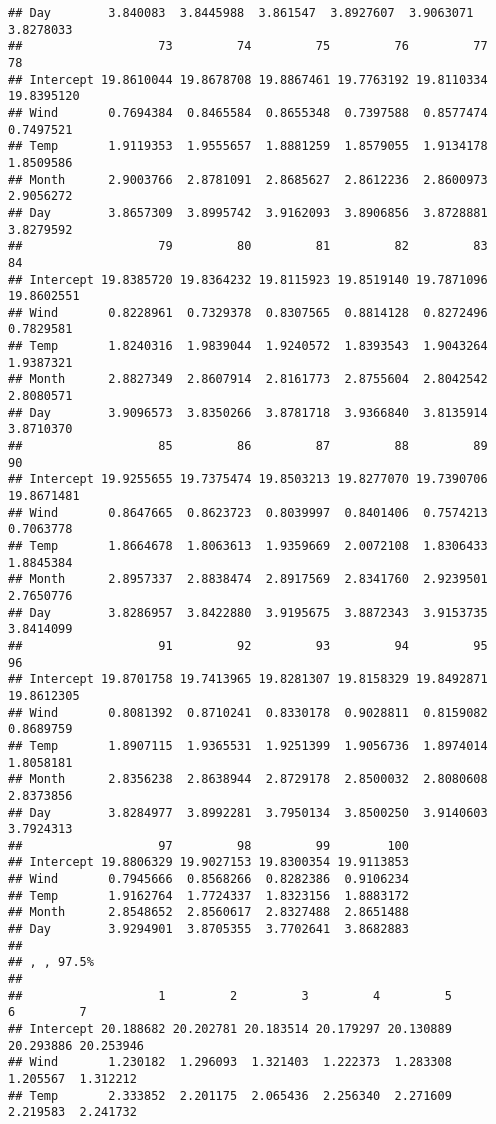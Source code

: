 \documentclass[
]{article}
\begin{document}
\begin{verbatim}
## Day        3.840083  3.8445988  3.861547  3.8927607  3.9063071  3.8278033
##                   73         74         75         76         77         78
## Intercept 19.8610044 19.8678708 19.8867461 19.7763192 19.8110334 19.8395120
## Wind       0.7694384  0.8465584  0.8655348  0.7397588  0.8577474  0.7497521
## Temp       1.9119353  1.9555657  1.8881259  1.8579055  1.9134178  1.8509586
## Month      2.9003766  2.8781091  2.8685627  2.8612236  2.8600973  2.9056272
## Day        3.8657309  3.8995742  3.9162093  3.8906856  3.8728881  3.8279592
##                   79         80         81         82         83         84
## Intercept 19.8385720 19.8364232 19.8115923 19.8519140 19.7871096 19.8602551
## Wind       0.8228961  0.7329378  0.8307565  0.8814128  0.8272496  0.7829581
## Temp       1.8240316  1.9839044  1.9240572  1.8393543  1.9043264  1.9387321
## Month      2.8827349  2.8607914  2.8161773  2.8755604  2.8042542  2.8080571
## Day        3.9096573  3.8350266  3.8781718  3.9366840  3.8135914  3.8710370
##                   85         86         87         88         89         90
## Intercept 19.9255655 19.7375474 19.8503213 19.8277070 19.7390706 19.8671481
## Wind       0.8647665  0.8623723  0.8039997  0.8401406  0.7574213  0.7063778
## Temp       1.8664678  1.8063613  1.9359669  2.0072108  1.8306433  1.8845384
## Month      2.8957337  2.8838474  2.8917569  2.8341760  2.9239501  2.7650776
## Day        3.8286957  3.8422880  3.9195675  3.8872343  3.9153735  3.8414099
##                   91         92         93         94         95         96
## Intercept 19.8701758 19.7413965 19.8281307 19.8158329 19.8492871 19.8612305
## Wind       0.8081392  0.8710241  0.8330178  0.9028811  0.8159082  0.8689759
## Temp       1.8907115  1.9365531  1.9251399  1.9056736  1.8974014  1.8058181
## Month      2.8356238  2.8638944  2.8729178  2.8500032  2.8080608  2.8373856
## Day        3.8284977  3.8992281  3.7950134  3.8500250  3.9140603  3.7924313
##                   97         98         99        100
## Intercept 19.8806329 19.9027153 19.8300354 19.9113853
## Wind       0.7945666  0.8568266  0.8282386  0.9106234
## Temp       1.9162764  1.7724337  1.8323156  1.8883172
## Month      2.8548652  2.8560617  2.8327488  2.8651488
## Day        3.9294901  3.8705355  3.7702641  3.8682883
## 
## , , 97.5%
## 
##                   1         2         3         4         5         6         7
## Intercept 20.188682 20.202781 20.183514 20.179297 20.130889 20.293886 20.253946
## Wind       1.230182  1.296093  1.321403  1.222373  1.283308  1.205567  1.312212
## Temp       2.333852  2.201175  2.065436  2.256340  2.271609  2.219583  2.241732

\end{verbatim}
\end{document}
